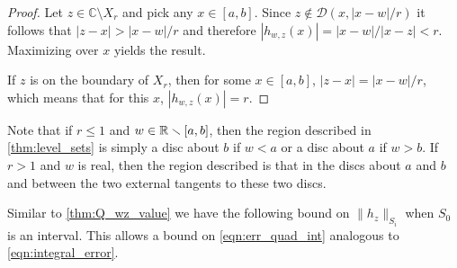 
\begin{proof}
Let \( z \in \mathbb{C}\setminus X_r \) and pick any \( x \in [a,b] \).
 Since \( z \not\in \mathcal{D}(x,|x-w|/r) \) it follows that \( |z-x| > |x-w|/r \) and therefore \( |h_{w,z}(x)| = |x-w|/|x-z| < r \).
Maximizing over \( x \) yields the result.

If \( z\) is on the boundary of \( X_r \),  then for some \( x \in [a,b] \), \( |z-x| = |x-w|/r \), which means that for this \( x \), \(|h_{w,z}(x)| = r \).
\end{proof}
Note that if \( r \leq 1 \) and \( w \in \mathbb{R}\smallsetminus[a,b] \), then the region described in \cref{thm:level_sets} is simply a disc about \( b \) if \( w < a\) or a disc about \( a \) if \( w > b \).  If \( r > 1 \) and \( w \) is real, then the region described is that in the discs about \( a \) and \( b \) and between the two external tangents to these two discs.


Similar to \cref{thm:Q_wz_value} we have the following bound on $\|h_z\|_{S_i}$ when $S_0$ is an  interval.
This allows a bound on \cref{eqn:err_quad_int} analogous to \cref{eqn:integral_error}.




